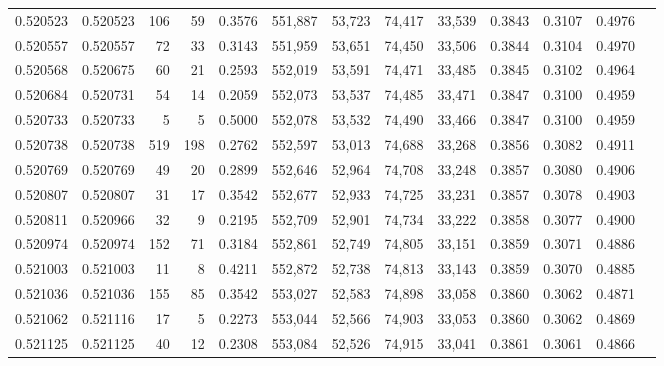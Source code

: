 \begin{tabular}{rrrrrrrrrrrrr}
0.520523 & 0.520523 &   106 &    59 &                                     0.3576 & 551,887 &  53,723 &  74,417 &  33,539 & 0.3843 & 0.3107 & 0.4976 \\
0.520557 & 0.520557 &    72 &    33 &                                     0.3143 & 551,959 &  53,651 &  74,450 &  33,506 & 0.3844 & 0.3104 & 0.4970 \\
0.520568 & 0.520675 &    60 &    21 &                                     0.2593 & 552,019 &  53,591 &  74,471 &  33,485 & 0.3845 & 0.3102 & 0.4964 \\
0.520684 & 0.520731 &    54 &    14 &                                     0.2059 & 552,073 &  53,537 &  74,485 &  33,471 & 0.3847 & 0.3100 & 0.4959 \\
0.520733 & 0.520733 &     5 &     5 &                                     0.5000 & 552,078 &  53,532 &  74,490 &  33,466 & 0.3847 & 0.3100 & 0.4959 \\
0.520738 & 0.520738 &   519 &   198 &                                     0.2762 & 552,597 &  53,013 &  74,688 &  33,268 & 0.3856 & 0.3082 & 0.4911 \\
0.520769 & 0.520769 &    49 &    20 &                                     0.2899 & 552,646 &  52,964 &  74,708 &  33,248 & 0.3857 & 0.3080 & 0.4906 \\
0.520807 & 0.520807 &    31 &    17 &                                     0.3542 & 552,677 &  52,933 &  74,725 &  33,231 & 0.3857 & 0.3078 & 0.4903 \\
0.520811 & 0.520966 &    32 &     9 &                                     0.2195 & 552,709 &  52,901 &  74,734 &  33,222 & 0.3858 & 0.3077 & 0.4900 \\
0.520974 & 0.520974 &   152 &    71 &                                     0.3184 & 552,861 &  52,749 &  74,805 &  33,151 & 0.3859 & 0.3071 & 0.4886 \\
0.521003 & 0.521003 &    11 &     8 &                                     0.4211 & 552,872 &  52,738 &  74,813 &  33,143 & 0.3859 & 0.3070 & 0.4885 \\
0.521036 & 0.521036 &   155 &    85 &                                     0.3542 & 553,027 &  52,583 &  74,898 &  33,058 & 0.3860 & 0.3062 & 0.4871 \\
0.521062 & 0.521116 &    17 &     5 &                                     0.2273 & 553,044 &  52,566 &  74,903 &  33,053 & 0.3860 & 0.3062 & 0.4869 \\
0.521125 & 0.521125 &    40 &    12 &                                     0.2308 & 553,084 &  52,526 &  74,915 &  33,041 & 0.3861 & 0.3061 & 0.4866 \\

\end{tabular}
